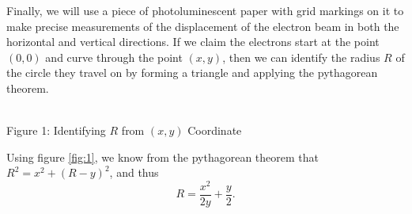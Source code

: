 \documentclass[11pt, letterpaper]{report}
\begin{document}
Finally, we will use a piece of photoluminescent paper with grid markings on it to make precise measurements of the displacement of the electron beam in both the horizontal and vertical directions. If we claim the electrons start at the point $(0,0)$ and curve through the point $(x,y)$, then we can identify the radius $R$ of the circle they travel on by forming a triangle and applying the pythagorean theorem.
\begin{center}
\\
\noindent Figure 1: Identifying $R$ from $(x,y)$ Coordinate\label{fig:1}
\end{center}
Using figure \ref{fig:1}, we know from the pythagorean theorem that $R^2=x^2+\left( R-y \right) ^2$, and thus
\begin{equation}\label{eq:9}
	R=\frac{x^2}{2y}+\frac{y}{2}
.\end{equation}
\end{document}
